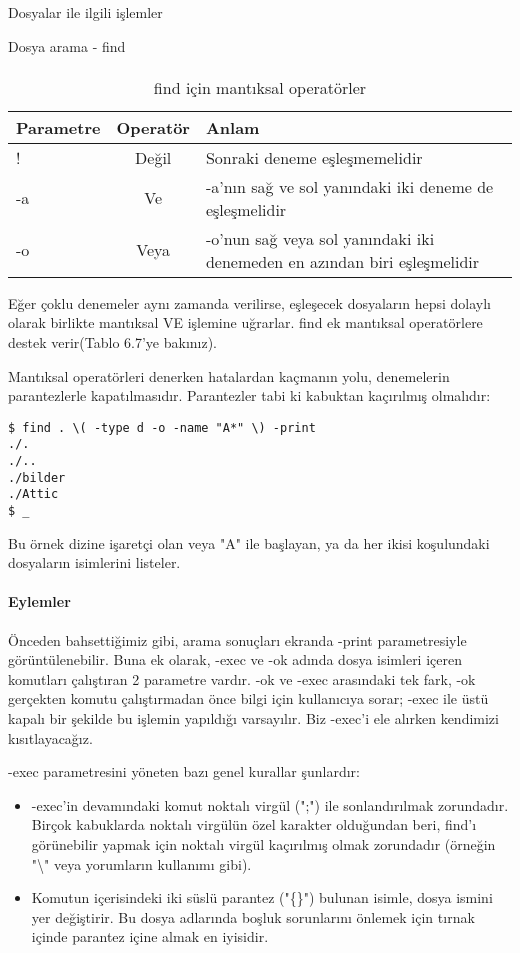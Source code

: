 \begin{section}{Dosyalar ile ilgili işlemler}
\begin{subsection}{Dosya arama - find}
\paragraph{}{
\begin {table}[H]
\caption {find için mantıksal operatörler} \label{tab:title} 
\begin{tabular}{l c l}
\hline
Parametre & Operatör & Anlam\\
\hline
! & Değil & Sonraki deneme eşleşmemelidir\\
-a & Ve & -a'nın sağ ve sol yanındaki iki deneme de eşleşmelidir\\
-o & Veya & -o'nun sağ veya sol yanındaki iki denemeden en azından biri eşleşmelidir\\
\hline
\end{tabular}
\end {table}
}

Eğer çoklu denemeler aynı zamanda verilirse, eşleşecek dosyaların hepsi dolaylı olarak birlikte mantıksal VE işlemine uğrarlar. find ek mantıksal operatörlere destek verir(Tablo 6.7'ye bakınız).

Mantıksal operatörleri denerken hatalardan kaçmanın yolu, denemelerin parantezlerle kapatılmasıdır. Parantezler tabi ki kabuktan kaçırılmış olmalıdır:

\begin{verbatim}
$ find . \( -type d -o -name "A*" \) -print
./.
./..
./bilder
./Attic
$ _
\end{verbatim}

Bu örnek dizine işaretçi olan veya "A" ile başlayan, ya da her ikisi koşulundaki dosyaların isimlerini listeler.

\paragraph{Eylemler} Önceden bahsettiğimiz gibi, arama sonuçları ekranda -print parametresiyle görüntülenebilir. Buna ek olarak, -exec ve -ok adında dosya isimleri içeren komutları çalıştıran 2 parametre vardır. -ok ve -exec arasındaki tek fark, -ok gerçekten komutu çalıştırmadan önce bilgi için kullanıcıya sorar; -exec ile üstü kapalı bir şekilde bu işlemin yapıldığı varsayılır. Biz -exec'i ele alırken kendimizi kısıtlayacağız.

-exec parametresini yöneten bazı genel kurallar şunlardır:
\begin{itemize}
\item -exec'in devamındaki komut noktalı virgül (";") ile sonlandırılmak zorundadır. Birçok kabuklarda noktalı virgülün özel karakter olduğundan beri, find'ı görünebilir yapmak için noktalı virgül kaçırılmış olmak zorundadır (örneğin "\textbackslash" veya yorumların kullanımı gibi).
\item Komutun içerisindeki iki süslü parantez ("\{\}") bulunan isimle, dosya ismini yer değiştirir. Bu dosya adlarında boşluk sorunlarını önlemek için tırnak içinde parantez içine almak en iyisidir.
\end{itemize}


\end{subsection}
\end{section}

